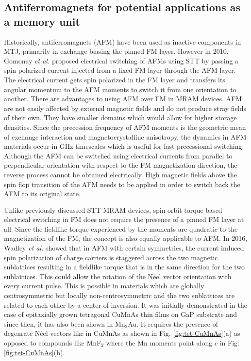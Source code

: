 \documentclass[11pt,edeposit,draftthesis]{uiucthesis2020}
\begin{document}
\begin{mainmatter}
\section{Antiferromagnets for potential applications as a memory unit}

Historically, antiferromagnets (AFM) have been used as inactive components in MTJ, primarily in exchange biasing the pinned FM layer. However in 2010, Gomonay \emph{et al.} proposed electrical switching of AFMs using STT by passing a spin polarized current injected from a fixed FM layer through the AFM layer. The electrical current gets spin polarized in the FM layer and transfers its angular momentum to the AFM moments to switch it from one orientation to another. There are advantages to using AFM over FM in MRAM devices. AFM are not easily affected by external magnetic fields and do not produce stray fields of their own. They have smaller domains which would allow for higher storage densities. Since the precession frequency of AFM moments is the geometric mean of exchange interaction and magnetocrystalline anisotropy, the dynamics in AFM materials occur in GHz timescales which is useful for fast precessional switching. Although the AFM can be switched using electrical currents from parallel to perpendicular orientation with respect to the FM magnetization direction, the reverse process cannot be obtained electrically. High magnetic fields above the spin flop transition of the AFM needs to be applied in order to switch back the AFM to its original state.

Unlike previously discussed STT MRAM devices, spin orbit torque based electrical switching in FM does not require the presence of a pinned FM layer at all. Since the fieldlike torque experienced by the moments are quadratic to the magnetization of the FM, the concept is also equally applicable to AFM. In 2016, Wadley \emph{et al.} showed that in AFM with certain symmetries, the current induced spin polarization of charge carriers is staggered across the two magnetic sublattices resulting in a fieldlike torque that is in the same direction for the two sublattices. This could allow the rotation of the N\'eel vector orientation with every current pulse. This is possible in materials which are globally centrosymmetric but locally non-centrosymmetric and the two sublattices are related to each other by a center of inversion. It was initially demonstrated in the case of epitaxially grown tetragonal CuMnAs thin films on GaP substrate and since then, it has also been shown in Mn$_2$Au. It requires the presence of degenrate N\'eel vectors like in CuMnAs as shown in Fig. \ref{fig:tet-CuMnAs}(a) as opposed to compounds like MnF$_2$ where the Mn moments point along $c$ in Fig. \ref{fig:tet-CuMnAs}(b).



\end{mainmatter}
\end{document}
